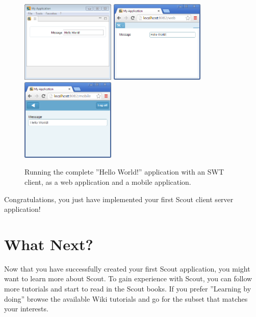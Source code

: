 \documentclass{article}
\begin{document}
\begin{figure}
\includegraphics[width=4.5cm]{helloworld_swt.png} \hspace{3mm}
\includegraphics[width=4.5cm]{helloworld_web.png} \hspace{3mm}
\includegraphics[width=4.5cm]{helloworld_mobile.png}
\caption{Running the complete ''Hello World!'' application with an SWT client, as a web application and a mobile application.}
\end{figure}

Congratulations, you just have implemented your first Scout client server application!

\section*{What Next?}

Now that you have successfully created your first Scout application, you might want to learn more about Scout. 
To gain experience with Scout, you can follow more tutorials and start to read in the Scout books.
If you prefer ''Learning by doing'' browse the available Wiki tutorials and go for the subset that matches your interests.
\end{document}
